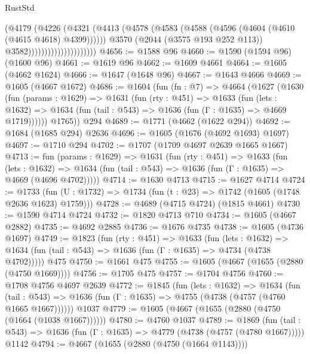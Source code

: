\begin{lexlean}{RustStd}
\begin{coremodule}
                                      (@4179
                                        (@4226
                                          (@4321
                                            (@4413
                                              (@4578
                                                (@4583
                                                  (@4588
                                                    (@4596 (@4604 (@4610 (@4615 @4618) @4399))))))
                                              @3570
                                              (@2044 (@3575 @193 @252 @113))
                                              @3582)))))))))))))))))))))
@4656 := @1588 @96
@4660 := @1590 (@1594 @96) (@1600 @96)
@4661 := @1619 @96
@4662 := @1609 @4661
@4664 := @1605 (@4662 @1624)
@4666 := @1647 (@1648 @96)
@4667 := @1643 @4666
@4669 := @1605 (@4667 @1672)
@4686 := @1604
    (fun (fn : @7) =>
    @4664
      (@1627
        (@1630
          (fun (params : @1629) =>
          @1631
            (fun (rty : @451) =>
            @1633
              (fun (lets : @1632) =>
              @1634 (fun (tail : @543) => @1636 (fun (Γ : @1635) => @4669 @1719))))))
        @1765))
    @294
@4689 := @1771 (@4662 (@1622 @294))
@4692 := @1684 (@1685 @294) @2636
@4696 := @1605 (@1676 (@4692 @1693) @1697)
@4697 := @1710 @294
@4702 := @1707 (@1709 @4697 @2639 @1665 @1667)
@4713 := fun (params : @1629) =>
  @1631
    (fun (rty : @451) =>
    @1633
      (fun (lets : @1632) =>
      @1634 (fun (tail : @543) => @1636 (fun (Γ : @1635) => @4669 (@4696 @4702)))))
@4714 := @1630 @4713
@4715 := @1627 @4714
@4724 := @1733 (fun (U : @1732) => @1734 (fun (t : @23) => @1742 (@1605 (@1748 @2636 @1623) @1759)))
@4728 := @4689 (@4715 @4724) (@1815 @4661)
@4730 := @1590 @4714 @4724
@4732 := @1820 @4713 @710
@4734 := @1605 (@4667 @2882)
@4735 := @4692 @2885
@4736 := @1676 @4735
@4738 := @1605 (@4736 @1697)
@4749 := @1823
    (fun (rty : @451) =>
    @1633
      (fun (lets : @1632) =>
      @1634 (fun (tail : @543) => @1636 (fun (Γ : @1635) => @4734 (@4738 @4702)))))
    @475
@4750 := @1661 @475
@4755 := @1605 (@4667 (@1655 (@2880 (@4750 @1669))))
@4756 := @1705 @475
@4757 := @1704 @4756
@4760 := @1708 @4756 @4697 @2639
@4772 := @1845
    (fun (lets : @1632) =>
    @1634
      (fun (tail : @543) => @1636 (fun (Γ : @1635) => @4755 (@4738 (@4757 (@4760 @1665 @1667))))))
    @1037
@4779 := @1605 (@4667 (@1655 (@2880 (@4750 (@1664 (@1038 @1667))))))
@4780 := @4760 @1037
@4789 := @1869
    (fun (tail : @543) => @1636 (fun (Γ : @1635) => @4779 (@4738 (@4757 (@4780 @1667)))))
    @1142
@4794 := @4667 (@1655 (@2880 (@4750 (@1664 @1143))))

\end{coremodule}
\end{lexlean}
